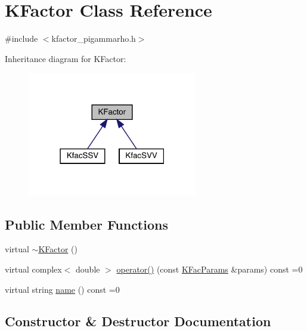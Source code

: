 \hypertarget{classKFactor}{}\section{K\+Factor Class Reference}
\label{classKFactor}


{\ttfamily \#include $<$kfactor\+\_\+pigammarho.\+h$>$}



Inheritance diagram for K\+Factor\+:
\nopagebreak
\begin{figure}[H]
\begin{center}
\leavevmode
\includegraphics[width=210pt]{d0/d85/classKFactor__inherit__graph}
\end{center}
\end{figure}
\subsection*{Public Member Functions}
\begin{DoxyCompactItemize}
\item 
virtual \mbox{\hyperlink{classKFactor_a8a39c5bbfa86a5603d95af238845cfd9}{$\sim$\+K\+Factor}} ()
\item 
virtual complex$<$ double $>$ \mbox{\hyperlink{classKFactor_a4273897de4ef590083c7ef208b8d0f18}{operator()}} (const \mbox{\hyperlink{classKFacParams}{K\+Fac\+Params}} \&params) const =0
\item 
virtual string \mbox{\hyperlink{classKFactor_ae578f8d6e4b525895427717da99cab6c}{name}} () const =0
\end{DoxyCompactItemize}


\subsection{Constructor \& Destructor Documentation}
\mbox{\label{classKFactor_a8a39c5bbfa86a5603d95af238845cfd9}} 
